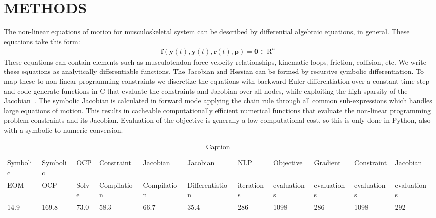 \documentclass[11pt,twocolumn]{article}
\begin{document}
\section*{METHODS}
%
The non-linear equations of motion for musculoskeletal system can be described
by differential algebraic equations, in general. These equations take this
form:
%
\begin{align}
  \mathbf{f}(\dot{\mathbf{y}}(t), \mathbf{y}(t), \mathbf{r}(t), \mathbf{p}) =
  \mathbf{0} \in \mathrm{R}^n
\end{align}
%
These equations can contain elements such as musculotendon force-velocity
relationships, kinematic loops, friction, collision, etc. We write these
equations as analytically differentiable functions. The Jacobian and Hessian can
be formed by recursive symbolic differentiation. To map these to non-linear
programming constraints we discretize the equations with backward Euler
differentiation over a constant time step and code generate functions in C that
evaluate the constraints and Jacobian over all nodes, while exploiting the high
sparsity of the Jacobian~\cite{Moore2018}. The symbolic Jacobian is calculated
in forward mode applying the chain rule through all common sub-expressions which
handles large equations of motion. This results in cacheable computationally
efficient numerical functions that evaluate the non-linear programming problem
constraints and its Jacobian. Evaluation of the objective is generally a low
computational cost, so this is only done in Python, also with a symbolic to
numeric conversion.
%
\begin{table*}[t]
  \centering
  \caption{Caption}
  \tiny
  \begin{tabular}{lllllllllll}
    Symbolic & Symbolic & OCP & Constraint & Jacobian  & Jacobian & NLP & Objective &  Gradient & Constraint & Jacobian \\
    EOM & OCP & Solve & Compilation &  Compilation & Differentiation & iterations & evaluations & evaluations & evaluations & evaluations \\
    14.9 & 169.8 & 73.0 & 58.3 & 66.7 & 35.4 & 286 & 1098 & 286 & 1098 & 292
  \end{tabular}
  \label{tab:my_label}
\end{table*}
\end{document}
